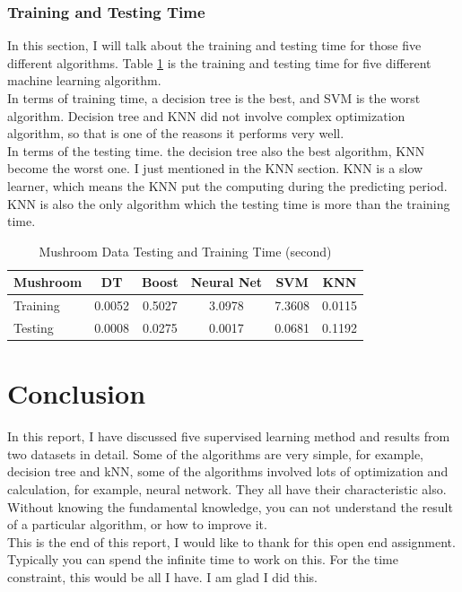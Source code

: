 \documentclass[10pt, conference, compsocconf]{IEEEtran}
\begin{document}
\subsubsection{Training and Testing Time}
In this section, I will talk about the training and testing time for those five different algorithms. Table \ref{tab:time} is the training and testing time for five different machine learning algorithm.\\
In terms of training time, a decision tree is the best, and SVM is the worst algorithm. Decision tree and KNN did not involve complex optimization algorithm, so that is one of the reasons it performs very well. \\
In terms of the testing time. the decision tree also the best algorithm, KNN become the worst one. I just mentioned in the KNN section. KNN is a slow learner, which means the KNN put the computing during the predicting period. KNN is also the only algorithm which the testing time is more than the training time. 
 \begin{table}[h]
 	\centering
 	\caption{Mushroom Data Testing and Training Time (second)}
 	\label{tab:time}
 	\begin{tabular}{|l|c|c|c|c|c|}
 		\hline
 		Mushroom & DT     & Boost  & Neural Net & SVM    & KNN    \\ \hline
 		Training & 0.0052 & 0.5027 & 3.0978     & 7.3608 & 0.0115 \\ \hline
 		Testing  & 0.0008 & 0.0275 & 0.0017     & 0.0681 & 0.1192 \\ \hline
 	\end{tabular}
 \end{table}

\section{Conclusion}
In this report, I have discussed five supervised learning method and results from two datasets in detail. Some of the algorithms are very simple, for example, decision tree and kNN, some of the algorithms involved lots of optimization and calculation, for example, neural network. They all have their characteristic also. Without knowing the fundamental knowledge, you can not understand the result of a particular algorithm, or how to improve it. \\

This is the end of this report, I would like to thank for this open end assignment. Typically you can spend the infinite time to work on this. For the time constraint, this would be all I have. I am glad I did this. 
\end{document}
